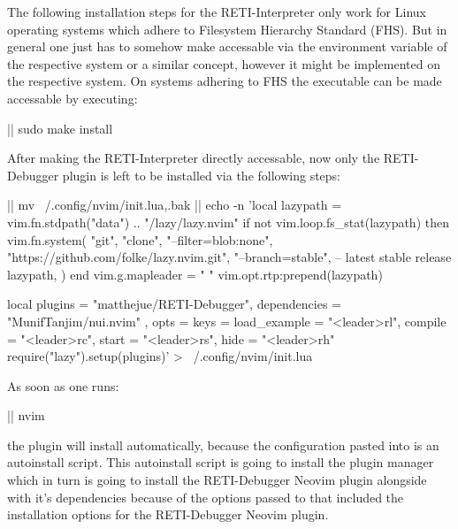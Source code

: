 \documentclass{report}
\begin{document}
The following installation steps for the RETI-Interpreter only work for Linux operating systems which adhere to \alert{Filesystem Hierarchy Standard} (FHS). But in general one just has to somehow make  accessable via the  environment variable of the respective system or a similar concept, however it might be implemented on the respective system. On systems adhering to FHS the executable can be made accessable by executing:

\begin{terminal}
  |\prompt| sudo make install
\end{terminal}

After making the RETI-Interpreter directly accessable, now only the RETI-Debugger plugin is left to be installed via the following steps:

\begin{terminal}
  |\prompt| mv ~/.config/nvim/init.lua{,.bak}
  |\prompt| echo -n 'local lazypath = vim.fn.stdpath("data") .. "/lazy/lazy.nvim"
  if not vim.loop.fs_stat(lazypath) then
    vim.fn.system({
      "git",
      "clone",
      "--filter=blob:none",
      "https://github.com/folke/lazy.nvim.git",
      "--branch=stable", -- latest stable release
      lazypath,
    })
  end
  vim.g.mapleader = " "
  vim.opt.rtp:prepend(lazypath)
\end{terminal}
\begin{terminal}
  local plugins = {
    {
      "matthejue/RETI-Debugger",
      dependencies = { "MunifTanjim/nui.nvim" },
      opts = {
          keys = {
            load_example = "<leader>rl",
            compile = "<leader>rc",
            start = "<leader>rs",
            hide = "<leader>rh"
          }
      }
    }
  }
  require("lazy").setup(plugins)' > ~/.config/nvim/init.lua
\end{terminal}

As soon as one runs:

\begin{terminal}
  |\prompt| nvim
\end{terminal}

the plugin will install automatically, because the configuration pasted into  is an autoinstall script. This autoinstall script is going to install the  \alert{plugin manager} which in turn is going to install the RETI-Debugger Neovim plugin alongside with it's dependencies because of the options passed to  that included the installation options for the RETI-Debugger Neovim plugin.
\end{document}
